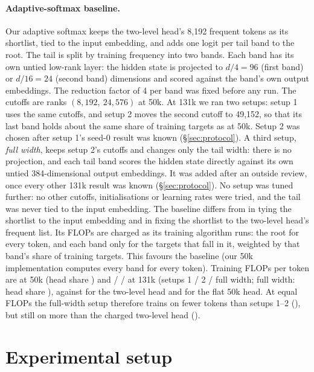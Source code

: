 \documentclass[11pt]{article}
\theoremstyle{remark}
\begin{document}
\paragraph{Adaptive-softmax baseline.} Our adaptive softmax keeps the two-level head's 8,192 frequent tokens as its shortlist,
tied to the input embedding, and adds one logit per tail band to the root. The tail is split by training frequency into two bands.
Each band has its own untied low-rank layer: the hidden state is projected to $d/4 = 96$ (first band) or $d/16 = 24$ (second
band) dimensions and scored against the band's own output embeddings. The reduction factor of 4 per band was fixed before any run. The cutoffs are ranks $(8{,}192,\ 24{,}576)$ at 50k. At 131k we ran two setups: setup 1 uses
the same cutoffs, and setup 2 moves the second cutoff to 49,152, so that its last band holds about the same share of training
targets as at 50k. Setup 2 was chosen after setup 1's seed-0 result was known (\S\ref{sec:protocol}). A third setup,
\emph{full width}, keeps setup 2's cutoffs and changes only the tail width: there is no projection, and each tail band scores the
hidden state directly against its own untied 384-dimensional output embeddings. It was added after an outside review, once
every other 131k result was known (\S\ref{sec:protocol}). No setup was tuned further: no other cutoffs, initialisations or
learning rates were tried, and the tail was never tied to the input embedding. The baseline differs from
\citet{grave2017efficient} in tying the shortlist to the input embedding and in fixing the shortlist to the two-level head's
frequent list. Its FLOPs are charged as its training algorithm runs: the root for every token, and each band only for the targets
that fall in it, weighted by that band's share of training targets. This favours the baseline (our 50k implementation computes
every band for every token). Training FLOPs per token are \FptAs{} at 50k (head share \ShareAs{}) and \FptAsBigOne{} /
\FptAsBigTwo{} / \FptAsBigW{} at 131k (setups 1 / 2 / full width; full width: head share \ShareAsBigW{}), against \FptHs{} for
the two-level head and \FptB{} for the flat 50k head. At equal FLOPs the full-width setup therefore trains on fewer tokens than
setups 1--2 (\TokAw{}), but still on more than the charged two-level head (\TokHcharged{}).

\section{Experimental setup}\label{sec:setup}
\end{document}
